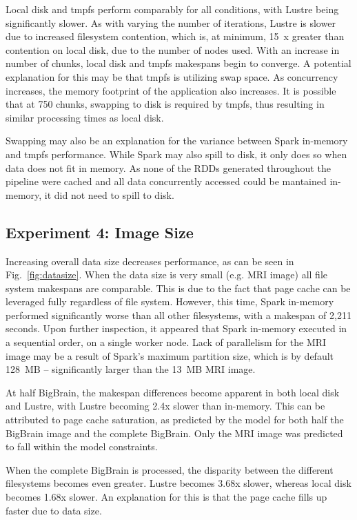 \documentclass{IEEEtran}
\begin{document}
Local disk and tmpfs perform comparably for all 
conditions, with Lustre being significantly slower. As with varying the number 
of iterations, Lustre is slower due to increased filesystem contention, which 
is, at minimum, 15~x greater than contention on local disk, due to the number of nodes
used. With an increase in 
number of chunks, local disk and tmpfs makespans begin to converge. A potential 
explanation for this may be that tmpfs is utilizing swap space. As concurrency 
increases, the memory footprint of the application also increases. It is 
possible that at 750 chunks, swapping to disk is required by tmpfs, thus 
resulting in similar processing times as local disk.


Swapping may also be an explanation for the variance between Spark in-memory 
and tmpfs performance. While Spark may also spill to disk, it only does so when
data does not fit in memory. As none of the RDDs generated throughout the 
pipeline were cached and all data concurrently accessed could be mantained 
in-memory, it did 
not need to spill to disk.

\subsection{Experiment 4: Image Size}

Increasing overall data size decreases performance, as can be seen in 
Fig.~\ref{fig:datasize}. When the data size is very small (e.g. MRI image) all 
file system makespans are comparable. This is due to the 
fact that page cache can be leveraged fully regardless of file system. However, 
this time, Spark in-memory performed significantly worse than all other 
filesystems, with a makespan of 2,211 seconds. Upon further inspection,
it appeared that Spark in-memory executed
in a sequential order, on a single worker node. Lack of parallelism for the MRI 
image may be a result of Spark's maximum partition size, which is by default 128~MB
-- significantly larger than the 13~MB MRI image. 

At half BigBrain, the makespan differences become apparent in both local disk 
and Lustre, with Lustre becoming 2.4x slower than in-memory. This 
can be attributed to page cache saturation, as predicted by the model for both 
half the BigBrain image and the complete BigBrain. Only the MRI image was 
predicted to fall within the model constraints. 

When the complete BigBrain is processed, the disparity between the different 
filesystems becomes even greater. Lustre becomes 3.68x slower, whereas local 
disk becomes 1.68x slower. An explanation for this is that the page cache fills 
up faster due to data size.
\end{document}
